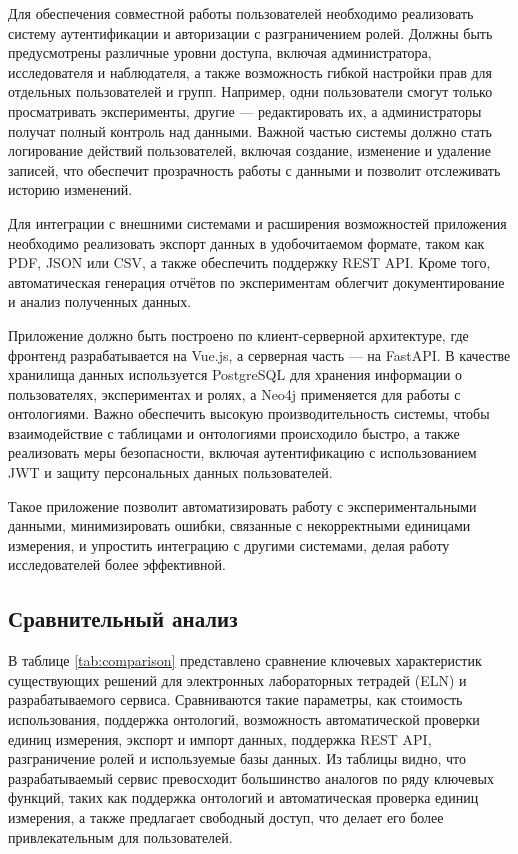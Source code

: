 Для обеспечения совместной работы пользователей необходимо реализовать систему аутентификации и авторизации с разграничением ролей. Должны быть предусмотрены различные уровни доступа, включая администратора, исследователя и наблюдателя, а также возможность гибкой настройки прав для отдельных пользователей и групп. Например, одни пользователи смогут только просматривать эксперименты, другие — редактировать их, а администраторы получат полный контроль над данными. Важной частью системы должно стать логирование действий пользователей, включая создание, изменение и удаление записей, что обеспечит прозрачность работы с данными и позволит отслеживать историю изменений.

Для интеграции с внешними системами и расширения возможностей приложения необходимо реализовать экспорт данных в удобочитаемом формате, таком как PDF, JSON или CSV, а также обеспечить поддержку REST API\cite{arch:REST}. Кроме того, автоматическая генерация отчётов по экспериментам облегчит документирование и анализ полученных данных.

Приложение должно быть построено по клиент-серверной архитектуре, где фронтенд разрабатывается на Vue.js\cite{Framework:VueJS}, а серверная часть — на FastAPI\cite{Framework:FastAPI}. В качестве хранилища данных используется PostgreSQL \cite{DB:PostgreSQL} для хранения информации о пользователях, экспериментах и ролях, а Neo4j применяется для работы с онтологиями. Важно обеспечить высокую производительность системы, чтобы взаимодействие с таблицами и онтологиями происходило быстро, а также реализовать меры безопасности, включая аутентификацию с использованием JWT\cite{Security:JWT} и защиту персональных данных пользователей.

Такое приложение позволит автоматизировать работу с экспериментальными данными, минимизировать ошибки, связанные с некорректными единицами измерения, и упростить интеграцию с другими системами, делая работу исследователей более эффективной.

\subsection{Сравнительный анализ}

В таблице \ref{tab:comparison} представлено сравнение ключевых характеристик существующих решений для электронных лабораторных тетрадей (ELN) и разрабатываемого сервиса. Сравниваются такие параметры, как стоимость использования, поддержка онтологий, возможность автоматической проверки единиц измерения, экспорт и импорт данных, поддержка REST API, разграничение ролей и используемые базы данных. Из таблицы видно, что разрабатываемый сервис превосходит большинство аналогов по ряду ключевых функций, таких как поддержка онтологий и автоматическая проверка единиц измерения, а также предлагает свободный доступ, что делает его более привлекательным для пользователей.

